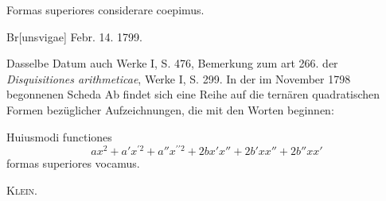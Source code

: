 \clearpage{}
\indent Formas superiores considerare coepimus.
\par\noindent\hfill Br[unsvigae] Febr. 14. 1799.

\medskip\begingroup\small
\indent Dasselbe Datum auch Werke I, S. 476, Bemerkung zum art 266. der \textit{Disquisitiones arithmeticae}, Werke I, S. 299. In der im November 1798 begonnenen Scheda Ab findet sich eine Reihe auf die ternären quadratischen Formen bezüglicher Aufzeichnungen, die mit den Worten beginnen:
\par\begingroup\normalsize
\indent Huiusmodi functiones
\[
ax^2+a'x^{\prime2}+a''x^{\prime\prime2}+2bx'x''+2b'xx''+2b''xx'
\]
\noindent formas superiores vocamus.
\par\endgroup
\noindent\hfill\textsc{Klein.}
\par\endgroup
